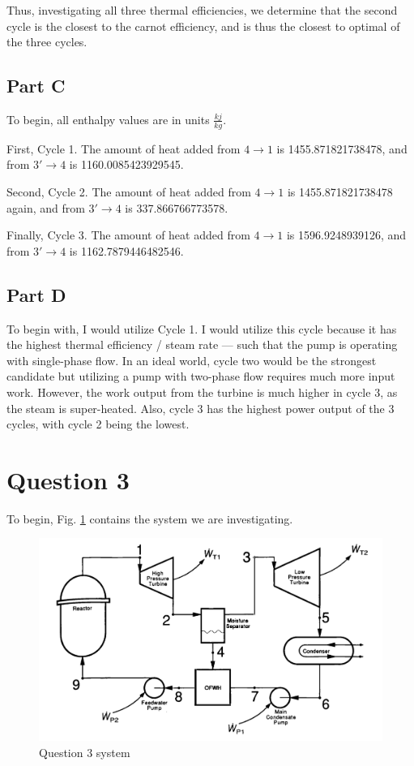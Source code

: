 \documentclass{article}
\begin{document}
Thus, investigating all three thermal efficiencies, we determine that the second cycle is the closest to the carnot efficiency, and is thus the closest to optimal of the three cycles. 

\subsection*{Part C}
To begin, all enthalpy values are in units $\frac{kj}{kg}$.

First, Cycle 1. The amount of heat added from $4\rightarrow1$ is 1455.871821738478, and from $3'\rightarrow4$ is 1160.0085423929545.

Second, Cycle 2. The amount of heat added from $4\rightarrow1$ is 1455.871821738478 again, and from $3'\rightarrow4$ is 337.866766773578. 

Finally, Cycle 3. The amount of heat added from $4\rightarrow1$ is 1596.9248939126, and from $3'\rightarrow4$ is 1162.7879446482546. 

\subsection*{Part D}
To begin with, I would utilize Cycle 1. I would utilize this cycle because it has the highest thermal efficiency / steam rate --- such that the pump is operating with single-phase flow. In an ideal world, cycle two would be the strongest candidate but utilizing a pump with two-phase flow requires much more input work. However, the work output from the turbine is much higher in cycle 3, as the steam is super-heated. Also, cycle 3 has the highest power output of the 3 cycles, with cycle 2 being the lowest. 


\newpage
\section*{Question 3}

To begin, Fig. \ref{fig:q3_config} contains the system we are investigating.

\begin{figure}[!h!]
    \centering
    \includegraphics[width=0.8\linewidth]{hw5_q3_config.png}
    \caption{Question 3 system}
    \label{fig:q3_config}
\end{figure}
\end{document}
